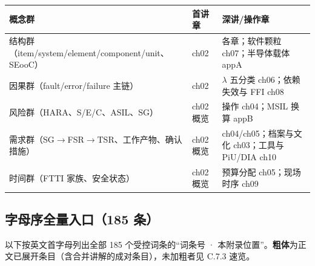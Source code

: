 \begin{center}
\begingroup\small
\setlength{\tabcolsep}{4pt}
\begin{tabularx}{\linewidth}{@{}XXX@{}}
\toprule
概念群 & 首讲章 & 深讲/操作章 \\
\midrule
结构群（item/system/element/component/unit、SEooC） & ch02 & 各章；软件颗粒 ch07；半导体载体 appA \\
因果群（fault/error/failure 主链） & ch02 & \(\lambda\) 五分类 ch06；依赖失效与 FFI ch08 \\
风险群（HARA、S/E/C、ASIL、SG） & ch02 概览 & 操作 ch04；MSIL 换算 appB \\
需求群（SG\(\rightarrow\)FSR\(\rightarrow\)TSR、工作产物、确认措施） & ch02 概览 & ch04/ch05；档案与文化 ch03；工具与 PiU/DIA ch10 \\
时间群（FTTI 家族、安全状态） & ch02 概览 & 预算分配 ch05；现场时序 ch09 \\
\bottomrule
\end{tabularx}
\endgroup
\end{center}

\subsection{字母序全量入口（185 条）}

以下按英文首字母列出全部 185 个受控词条的“词条号 · 本附录位置”。\textbf{粗体}为正文已展开条目（含合并讲解的成对条目），未加粗者见 C.7.3 速览。

